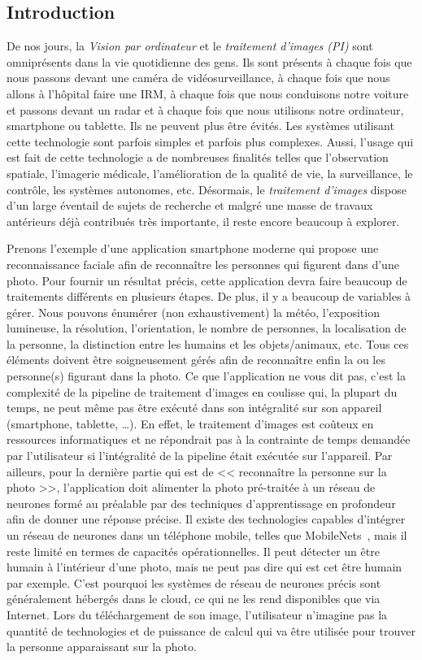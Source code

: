 \subsection*{Introduction}


De nos jours, la \emph{Vision par ordinateur} et le \emph{traitement d'images (PI)} sont omniprésents dans la vie
quotidienne des gens. Ils sont présents à chaque fois que nous passons devant une caméra de vidéosurveillance, à chaque
fois que nous allons à l'hôpital faire une IRM, à chaque fois que nous conduisons notre voiture et passons devant un
radar et à chaque fois que nous utilisons notre ordinateur, smartphone ou tablette. Ils ne peuvent plus être évités. Les
systèmes utilisant cette technologie sont parfois simples et parfois plus complexes. Aussi, l'usage qui est fait de
cette technologie a de nombreuses finalités telles que l'observation spatiale, l'imagerie médicale, l'amélioration de la
qualité de vie, la surveillance, le contrôle, les systèmes autonomes, etc. Désormais, le \emph{traitement d'images}
dispose d'un large éventail de sujets de recherche et malgré une masse de travaux antérieurs déjà contribués très
importante, il reste encore beaucoup à explorer.

Prenons l'exemple d'une application smartphone moderne qui propose une reconnaissance faciale afin de reconnaître les
personnes qui figurent dans d'une photo. Pour fournir un résultat précis, cette application devra faire beaucoup de
traitements différents en plusieurs étapes. De plus, il y a beaucoup de variables à gérer. Nous pouvons énumérer (non
exhaustivement) la météo, l'exposition lumineuse, la résolution, l'orientation, le nombre de personnes, la localisation
de la personne, la distinction entre les humains et les objets/animaux, etc. Tous ces éléments doivent être
soigneusement gérés afin de reconnaître enfin la ou les personne(s) figurant dans la photo. Ce que l'application ne vous
dit pas, c'est la complexité de la pipeline de traitement d'images en coulisse  qui, la plupart du temps, ne peut même
pas être exécuté dans son intégralité sur son appareil (smartphone, tablette, \ldots). En effet, le traitement d'images
est coûteux en ressources informatiques et ne répondrait pas à la contrainte de temps demandée par l'utilisateur si
l'intégralité de la pipeline était exécutée sur l'appareil. Par ailleurs, pour la dernière partie qui est de <<
reconnaître la personne sur la photo >>, l'application doit alimenter la photo pré-traitée à un réseau de neurones formé
au préalable par des techniques d'apprentissage en profondeur afin de donner une réponse précise. Il existe des
technologies capables d'intégrer un réseau de neurones dans un téléphone mobile, telles que
MobileNets~\parencite{howard.2017.mobilenets}, mais il reste limité en termes de capacités opérationnelles. Il peut
détecter un être humain à l'intérieur d'une photo, mais ne peut pas dire qui est cet être humain par exemple. C'est
pourquoi les systèmes de réseau de neurones précis sont généralement hébergés dans le cloud, ce qui ne les rend
disponibles que via Internet. Lors du téléchargement de son image, l'utilisateur n'imagine pas la quantité de
technologies et de puissance de calcul qui va être utilisée pour trouver la personne apparaissant sur la photo.

